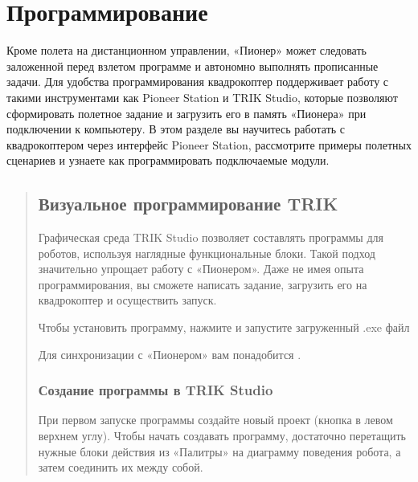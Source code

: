 \documentclass[a4paper,10pt,russian]{sphinxmanual}
\begin{document}
\chapter{Программирование}
\label{\detokenize{programming/programming:id1}}\label{\detokenize{programming/programming::doc}}
Кроме полета на дистанционном управлении, «Пионер» может следовать заложенной перед взлетом программе и автономно выполнять прописанные задачи. Для удобства программирования квадрокоптер поддерживает работу с такими инструментами как Pioneer Station и TRIK Studio, которые позволяют сформировать полетное задание и загрузить его в память «Пионера» при подключении к компьютеру.
В этом разделе вы научитесь работать с квадрокоптером через интерфейс Pioneer Station, рассмотрите примеры полетных сценариев и узнаете как программировать подключаемые модули.
\begin{quote}


\section{Визуальное программирование TRIK}
\label{\detokenize{programming/trik/trik_main:trik}}\label{\detokenize{programming/trik/trik_main::doc}}

Графическая среда TRIK Studio позволяет составлять программы для роботов, используя наглядные функциональные блоки. Такой подход значительно упрощает работу с «Пионером». Даже не имея опыта программирования, вы сможете написать задание, загрузить его на квадрокоптер и осуществить запуск.

Чтобы установить программу, нажмите  и запустите загруженный .exe файл

Для синхронизации с «Пионером» вам понадобится {\hyperref[\detokenize{programming/pioneer_station/pioneer_station_main::doc}]{}}.


\subsection{Создание программы в TRIK Studio}
\label{\detokenize{programming/trik/trik_create:trik-studio}}\label{\detokenize{programming/trik/trik_create::doc}}
При первом запуске программы создайте новый проект (кнопка в левом верхнем углу). Чтобы начать создавать программу, достаточно перетащить нужные блоки действия из «Палитры» на диаграмму поведения робота, а затем соединить их между собой.


\end{quote}
\end{document}
